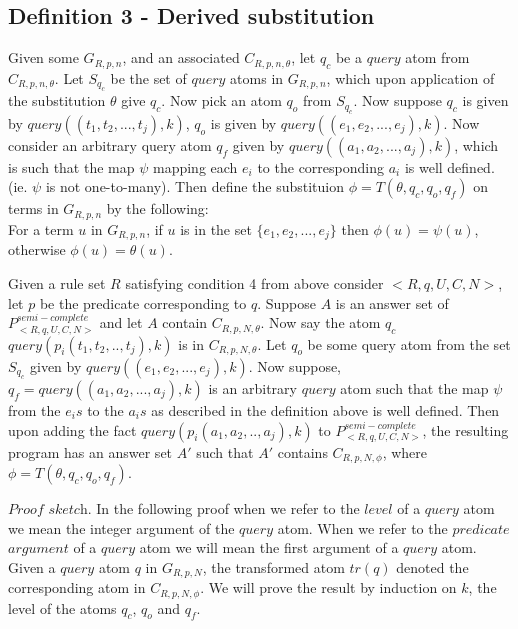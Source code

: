 \documentclass{article}
\begin{document}
\subsection{Definition 3 - Derived substitution}
Given some $G_{R,p,n}$, and an associated $C_{R,p,n,\theta}$, let $q_{c}$ be a $query$ atom from $C_{R,p,n,\theta}$. Let $S_{q_{c}}$ be the set of $query$ atoms in $G_{R,p,n}$, which upon application of the substitution $\theta$ give $q_{c}$. Now pick an atom $q_{o}$ from $S_{q_{c}}$. Now suppose $q_{c}$ is given by $query((t_{1},t_{2},...,t_{j}),k)$, $q_{o}$ is given by $query((e_{1},e_{2},...,e_{j}),k)$. Now consider an arbitrary query atom $q_{f}$ given by $query((a_{1},a_{2},...,a_{j}),k)$, which is such that the map $\psi$ mapping each $e_{i}$ to the corresponding $a_{i}$ is well defined. (ie. $\psi$ is not one-to-many). Then define the substituion $\phi = T(\theta, q_{c},q_{o},q_{f})$ on terms in $G_{R,p,n}$ by the following:\\ For a term $u$ in $G_{R,p,n}$, if $u$ is in the set $\{e_{1},e_{2},...,e_{j}\}$ then $\phi(u) = \psi(u)$, otherwise $\phi(u) = \theta(u)$.\\
\newline
\begin{theorem}\label{termsub}
Given a rule set $R$ satisfying condition 4 from above consider $<R,q,U,C,N>$, let $p$ be the predicate corresponding to $q$. Suppose $A$ is an answer set of $P^{semi-complete}_{<R,q,U,C,N>}$ and let $A$ contain $C_{R,p,N,\theta}$. Now say the atom $q_{c}$ $query(p_{i}(t_{1},t_{2},..,t_{j}),k)$ is in $C_{R,p,N,\theta}$. Let $q_{o}$ be some query atom from the set $S_{q_{c}}$ given by $query((e_{1},e_{2},...,e_{j}),k)$. Now suppose, $q_{f}= query((a_{1},a_{2},...,a_{j}),k)$ is an arbitrary $query$ atom such that the map $\psi$ from the $e_{i}s$ to the $a_{i}s$ as described in the definition above is well defined. Then upon adding the fact $query(p_{i}(a_{1},a_{2},..,a_{j}),k)$ to $P^{semi-complete}_{<R,q,U,C,N>}$, the resulting program has an answer set $A'$ such that $A'$ contains $C_{R,p,N,\phi}$, where $\phi = T(\theta, q_{c}, q_{o}, q_{f})$. 
\end{theorem}
$\textit{Proof sketch}$. In the following proof when we refer to the $level$ of a $query$ atom we mean the integer argument of the $query$ atom. When we refer to the $predicate$ $argument$ of a $query$ atom we will mean the first argument of a $query$ atom. Given a $query$ atom $q$ in $G_{R,p,N}$, the transformed atom $tr(q)$ denoted the corresponding atom in $C_{R,p,N,\phi}$. We will prove the result by induction on $k$, the level of the atoms $q_{c}$, $q_{o}$ and $q_{f}$. \\
\end{document}
